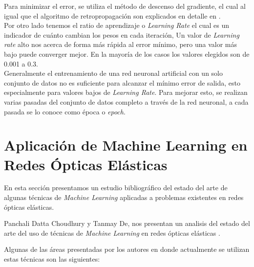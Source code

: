 Para minimizar el error, se utiliza el método de descenso del gradiente, el cual al igual que el algoritmo de retropropagación son explicados en detalle en \cite{rashid2016make}.\\

Por otro lado tenemos el ratio de aprendizaje o \textit{Learning Rate} el cual es un indicador de cuánto cambian los pesos en cada iteración, Un valor de \textit{Learning rate} alto nos acerca de forma más rápida al error mínimo, pero una valor más bajo puede converger mejor. En la mayoría de los casos los valores elegidos son de 0.001 a 0.3.\\

Generalmente el entrenamiento de una red neuronal artificial con un solo conjunto de datos no es suficiente para alcanzar el mínimo error de salida, esto especialmente para valores bajos de \textit{Learning Rate}. Para mejorar esto, se realizan varias pasadas del conjunto de datos completo a través de la red neuronal, a cada pasada se lo conoce como época o \textit{epoch}. 

\section{Aplicación de Machine Learning en Redes Ópticas Elásticas}

En esta sección presentamos un estudio bibliográfico  del estado del arte de algunas técnicas de \textit{Machine Learning} aplicadas a problemas existentes en redes ópticas elásticas.

Panchali Datta Choudhury y Tanmay De, nos presentan un analisis del estado del arte  del uso de técnicas de \textit{Machine Learning} en redes ópticas elásticas \cite{choudhury2019recent}.

Algunas de las áreas presentadas por los autores en donde actualmente se utilizan estas técnicas son las siguientes:



